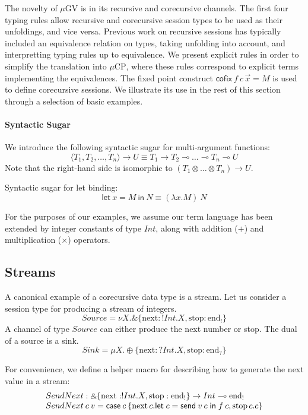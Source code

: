 \documentclass[orivec,envcountsame]{llncs}
\makeatletter
\newcommand{\with}{\mathbin\binampersand}
\newcommand{\lto}{\ensuremath{\multimap}}
\newcommand{\uto}{\ensuremath{\rightarrow}}
\newcommand{\outterm}{\mathrm{end}_!}
\newcommand{\interm}{\mathrm{end}_?}
\newcommand{\mkwd}[1]{\mathsf{#1}}
\newcommand{\clabel}[1]{\mathrm{#1}}
\newcommand{\gvsend}[2]{\mkwd{send}\:#1\:#2}
\newcommand{\gvlet}[3]{\mkwd{let}\;#1 = #2\;\mkwd{in}\;#3}
\newcommand{\gvcase}[2]{\mkwd{case}\:#1\:\{#2\}}
\newcommand{\lrkwd}{\mkwd{cofix}}
\newcommand{\gvfix}[3]{\lrkwd\:#1\:#2 = #3}
\newcommand{\key}{\mkwd}
\newcommand{\mucp}{$\mu\mathrm{CP}$\xspace}
\newcommand{\mugv}{$\mu\mathrm{GV}$\xspace}
\newcommand{\ba}{\begin{array}}
\newcommand{\ea}{\end{array}}
\newcommand{\bl}{\ba[t]{@{}l@{}}}
\newcommand{\el}{\ea}
\makeatother
\begin{document}
The novelty of \mugv is in its recursive and corecursive channels. The first four typing rules allow
recursive and corecursive session types to be used as their unfoldings, and vice versa. Previous
work on recursive sessions has typically included an equivalence relation on types, taking unfolding
into account, and interpretting typing rules up to equivalence. We present explicit rules in order
to simplify the translation into \mucp, where these rules correspond to explicit terms implementing
the equivalences.
%
The fixed point construct $\gvfix{f}{c\,\vec{x}}{M}$ is used to define corecursive sessions. We
illustrate its use in the rest of this section through a selection of basic examples.

\paragraph{Syntactic Sugar}

We introduce the following syntactic sugar for multi-argument functions:
\[
  \langle T_1, T_2, \dots, T_n \rangle \uto U \equiv T_1 \uto T_2 \lto \dots \lto T_n \lto U
\]
Note that the right-hand side is isomorphic to $(T_1 \otimes \dots \otimes T_n) \uto U$.

Syntactic sugar for let binding:
\[
\key{let}\:x=M\:\key{in}\:N \equiv (\lambda x.M)\:N
\]

For the purposes of our examples, we assume our term language has been extended by integer constants
of type $Int$, along with addition ($+$) and multiplication ($\times$) operators.

\subsection{Streams}

A canonical example of a corecursive data type is a stream. Let us consider a session type for
producing a stream of integers.
%
\[
Source = \nu X.\with \{\clabel{next}: !Int.X, \clabel{stop}: \outterm \}
\]
%
A channel of type $Source$ can either produce the next number or stop. The dual of a source is a
sink.
\[
Sink = \mu X.\oplus \{\clabel{next}: ?Int.X, \clabel{stop}: \interm \}
\]

For convenience, we define a helper macro for describing how to generate the next value in a stream:
\[
\bl
SendNext : \with \{\clabel{next}: !Int.X, \clabel{stop}: \outterm \} \uto Int \lto \outterm \\
SendNext\:c\:v = \gvcase{c}{\clabel{next}\,c.\gvlet{c}{\gvsend{v}{c}}{f\:c},
                            \clabel{stop}\,c.c}
\el
\]
\end{document}
